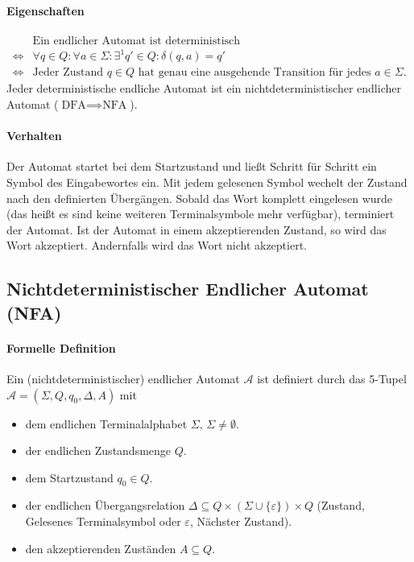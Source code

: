         \paragraph{Eigenschaften}
            \begin{equation*}
                \begin{split}
                         & \text{Ein endlicher Automat ist deterministisch}
                    \\
                    \iff & \forall q \in Q : \forall a \in \Sigma : \exists ^ 1 q' \in Q : \delta(q, a) = q'
                    \\
                    \iff & \text{Jeder Zustand } q \in Q \text{ hat genau eine ausgehende Transition für jedes } a \in \Sigma.
                \end{split}
            \end{equation*}
            Jeder deterministische endliche Automat ist ein nichtdeterministischer endlicher Automat ($ \text{DFA} \implies \text{NFA} $).

        \paragraph{Verhalten}
            \label{dfa:verhalten}
            Der Automat startet bei dem Startzustand und ließt Schritt für Schritt ein Symbol des Eingabewortes ein. Mit jedem gelesenen Symbol wechelt der Zustand nach den definierten Übergängen. Sobald das Wort komplett eingelesen wurde (das heißt es sind keine weiteren Terminalsymbole mehr verfügbar), terminiert der Automat. Ist der Automat in einem akzeptierenden Zustand, so wird das Wort akzeptiert. Andernfalls wird das Wort nicht akzeptiert.


    \subsection{Nichtdeterministischer Endlicher Automat (NFA)}
        \paragraph{Formelle Definition}
            Ein (nichtdeterministischer) endlicher Automat $ \mathcal{A} $ ist definiert durch das 5-Tupel $ \mathcal{A} = (\Sigma, Q, q _ 0, \Delta, A) $ mit
            \begin{itemize}
                \item dem endlichen Terminalalphabet $ \Sigma $, $ \Sigma \neq \emptyset $.
                \item der endlichen Zustandsmenge $ Q $.
                \item dem Startzustand $ q _ 0 \in Q $.
                \item der endlichen Übergangsrelation $ \Delta \subseteq Q \times (\Sigma \cup \{ \varepsilon \}) \times Q $ (Zustand, Gelesenes Terminalsymbol oder $ \varepsilon $, Nächster Zustand).
                \item den akzeptierenden Zuständen $ A \subseteq Q $.
            \end{itemize}


